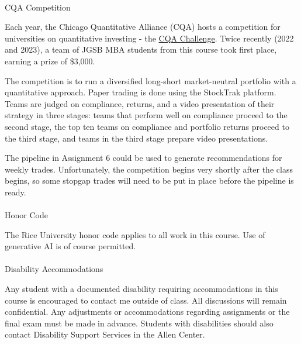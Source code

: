 \documentclass[
  letterpaper,
  DIV=11,
  numbers=noendperiod]{scrartcl}
\makeatletter
\let\oldparagraph\paragraph
\renewcommand{\paragraph}{
    \@ifstar
      \xxxParagraphStar
      \xxxParagraphNoStar
  }
\newcommand{\xxxParagraphStar}[1]{\oldparagraph*{#1}\mbox{}}
\newcommand{\xxxParagraphNoStar}[1]{\oldparagraph{#1}\mbox{}}
\makeatother
\begin{document}
\paragraph{CQA Competition}\label{cqa-competition}

Each year, the Chicago Quantitative Alliance (CQA) hosts a competition
for universities on quantitative investing - the
\href{https://www.cqa.org/investment_challenge}{CQA Challenge}. Twice
recently (2022 and 2023), a team of JGSB MBA students from this course
took first place, earning a prize of \$3,000.

The competition is to run a diversified long-short market-neutral
portfolio with a quantitative approach. Paper trading is done using the
StockTrak platform. Teams are judged on compliance, returns, and a video
presentation of their strategy in three stages: teams that perform well
on compliance proceed to the second stage, the top ten teams on
compliance and portfolio returns proceed to the third stage, and teams
in the third stage prepare video presentations.

The pipeline in Assignment 6 could be used to generate recommendations
for weekly trades. Unfortunately, the competition begins very shortly
after the class begins, so some stopgap trades will need to be put in
place before the pipeline is ready.

\paragraph{Honor Code}\label{honor-code}

The Rice University honor code applies to all work in this course. Use
of generative AI is of course permitted.

\paragraph{Disability Accommodations}\label{disability-accommodations}

Any student with a documented disability requiring accommodations in
this course is encouraged to contact me outside of class. All
discussions will remain confidential. Any adjustments or accommodations
regarding assignments or the final exam must be made in advance.
Students with disabilities should also contact Disability Support
Services in the Allen Center.
\end{document}
